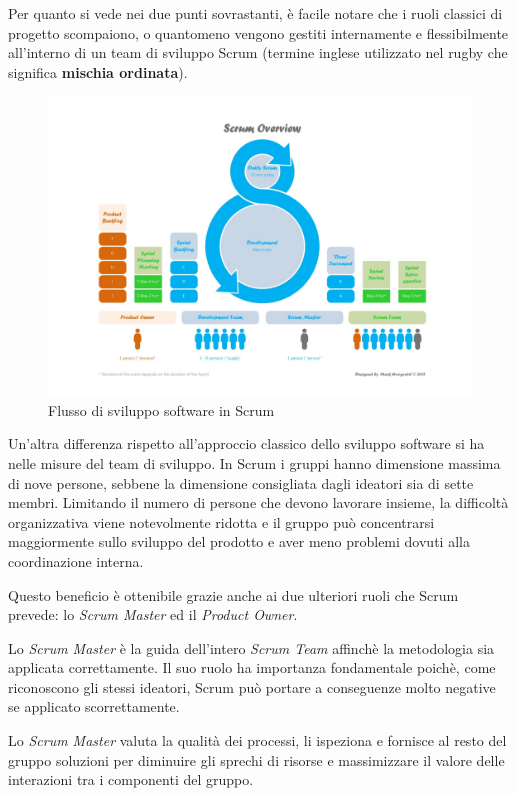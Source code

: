 Per quanto si vede nei due punti sovrastanti, è facile notare che i ruoli
classici di progetto scompaiono, o quantomeno vengono gestiti internamente e
flessibilmente all'interno di un team di sviluppo Scrum (termine inglese
utilizzato nel rugby che significa \textbf{mischia ordinata}).

\begin{figure}%
\includegraphics[width=\columnwidth]{immagini/scrum-schema}%
\caption{Flusso di sviluppo software in Scrum}%
\label{fig:scrum-schema}%
\end{figure}

Un'altra differenza rispetto all'approccio classico dello sviluppo software si
ha nelle misure del team di sviluppo. In Scrum i gruppi hanno dimensione
massima di nove persone, sebbene la dimensione consigliata dagli ideatori sia
di sette membri. Limitando il numero di persone che devono lavorare insieme, la
difficoltà organizzativa viene notevolmente ridotta e il gruppo può
concentrarsi maggiormente sullo sviluppo del prodotto e aver meno problemi
dovuti alla coordinazione interna.

Questo beneficio è ottenibile grazie anche ai due ulteriori ruoli che Scrum
prevede: lo \emph{Scrum Master} ed il \emph{Product Owner}.

Lo \emph{Scrum Master} è la guida dell'intero \emph{Scrum Team} affinchè la
metodologia sia applicata correttamente. Il suo ruolo ha importanza
fondamentale poichè, come riconoscono gli stessi ideatori, Scrum può portare a
conseguenze molto negative se applicato scorrettamente.

Lo \emph{Scrum Master} valuta la qualità dei processi, li ispeziona e fornisce
al resto del gruppo soluzioni per diminuire gli sprechi di risorse e
massimizzare il valore delle interazioni tra i componenti del gruppo.

